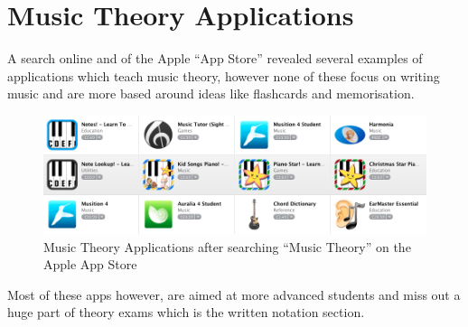 \section{Music Theory Applications}
\label{sec:music-theory-apps}
A search online and of the Apple ``App Store'' revealed several examples of applications which teach music theory, however none of these focus on writing music and are more based around ideas like flashcards and memorisation.

\begin{figure}[h!]
  \centering
  \includegraphics[width=\linewidth]{gfx/music-theory-apps.png}
  \caption{Music Theory Applications after searching ``Music Theory'' on the Apple App Store}
\end{figure}

Most of these apps however, are aimed at more advanced students and miss out a huge part of theory exams which is the written notation section.
